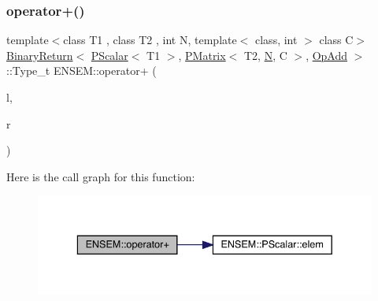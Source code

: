 \subsubsection{\texorpdfstring{operator+()}{operator+()}\hspace{0.1cm}{\footnotesize\ttfamily [4/4]}}
{\footnotesize\ttfamily template$<$class T1 , class T2 , int N, template$<$ class, int $>$ class C$>$ \\
\mbox{\hyperlink{structENSEM_1_1BinaryReturn}{Binary\+Return}}$<$ \mbox{\hyperlink{classENSEM_1_1PScalar}{P\+Scalar}}$<$ T1 $>$, \mbox{\hyperlink{classENSEM_1_1PMatrix}{P\+Matrix}}$<$ T2, \mbox{\hyperlink{operator__name__util_8cc_a7722c8ecbb62d99aee7ce68b1752f337}{N}}, C $>$, \mbox{\hyperlink{structENSEM_1_1OpAdd}{Op\+Add}} $>$\+::Type\+\_\+t E\+N\+S\+E\+M\+::operator+ (\begin{DoxyParamCaption}\item[{const \mbox{\hyperlink{classENSEM_1_1PScalar}{P\+Scalar}}$<$ T1 $>$ \&}]{l,  }\item[{const \mbox{\hyperlink{classENSEM_1_1PMatrix}{P\+Matrix}}$<$ T2, \mbox{\hyperlink{operator__name__util_8cc_a7722c8ecbb62d99aee7ce68b1752f337}{N}}, C $>$ \&}]{r }\end{DoxyParamCaption})\hspace{0.3cm}{\ttfamily [inline]}}

Here is the call graph for this function\+:\nopagebreak
\begin{figure}[H]
\begin{center}
\leavevmode
\includegraphics[width=336pt]{df/d0a/group__primmatrix_ga39561cdaedaf3bb4fb108575dae42de6_cgraph}
\end{center}
\end{figure}
\mbox{\label{group__primmatrix_ga76960c32943a9f55860945f47f02de5b}} 
